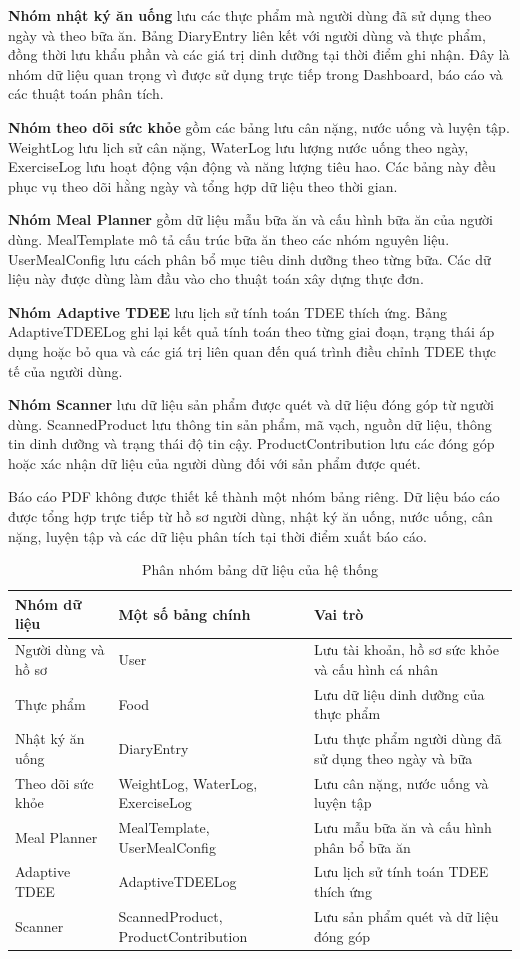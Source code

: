 \documentclass[12pt, a4paper]{report}
\begin{document}
\textbf{Nhóm nhật ký ăn uống} lưu các thực phẩm mà người dùng đã sử dụng theo ngày và theo bữa ăn. Bảng DiaryEntry liên kết với người dùng và thực phẩm, đồng thời lưu khẩu phần và các giá trị dinh dưỡng tại thời điểm ghi nhận. Đây là nhóm dữ liệu quan trọng vì được sử dụng trực tiếp trong Dashboard, báo cáo và các thuật toán phân tích.

\textbf{Nhóm theo dõi sức khỏe} gồm các bảng lưu cân nặng, nước uống và luyện tập. WeightLog lưu lịch sử cân nặng, WaterLog lưu lượng nước uống theo ngày, ExerciseLog lưu hoạt động vận động và năng lượng tiêu hao. Các bảng này đều phục vụ theo dõi hằng ngày và tổng hợp dữ liệu theo thời gian.

\textbf{Nhóm Meal Planner} gồm dữ liệu mẫu bữa ăn và cấu hình bữa ăn của người dùng. MealTemplate mô tả cấu trúc bữa ăn theo các nhóm nguyên liệu. UserMealConfig lưu cách phân bổ mục tiêu dinh dưỡng theo từng bữa. Các dữ liệu này được dùng làm đầu vào cho thuật toán xây dựng thực đơn.

\textbf{Nhóm Adaptive TDEE} lưu lịch sử tính toán TDEE thích ứng. Bảng AdaptiveTDEELog ghi lại kết quả tính toán theo từng giai đoạn, trạng thái áp dụng hoặc bỏ qua và các giá trị liên quan đến quá trình điều chỉnh TDEE thực tế của người dùng.

\textbf{Nhóm Scanner} lưu dữ liệu sản phẩm được quét và dữ liệu đóng góp từ người dùng. ScannedProduct lưu thông tin sản phẩm, mã vạch, nguồn dữ liệu, thông tin dinh dưỡng và trạng thái độ tin cậy. ProductContribution lưu các đóng góp hoặc xác nhận dữ liệu của người dùng đối với sản phẩm được quét.

Báo cáo PDF không được thiết kế thành một nhóm bảng riêng. Dữ liệu báo cáo được tổng hợp trực tiếp từ hồ sơ người dùng, nhật ký ăn uống, nước uống, cân nặng, luyện tập và các dữ liệu phân tích tại thời điểm xuất báo cáo.

\begin{table}[htbp]
\centering
\caption{Phân nhóm bảng dữ liệu của hệ thống}
\begin{tabular}{|p{4cm}|p{4cm}|p{7cm}|}
\hline
\textbf{Nhóm dữ liệu} & \textbf{Một số bảng chính} & \textbf{Vai trò} \\
\hline
Người dùng và hồ sơ & User & Lưu tài khoản, hồ sơ sức khỏe và cấu hình cá nhân \\
\hline
Thực phẩm & Food & Lưu dữ liệu dinh dưỡng của thực phẩm \\
\hline
Nhật ký ăn uống & DiaryEntry & Lưu thực phẩm người dùng đã sử dụng theo ngày và bữa \\
\hline
Theo dõi sức khỏe & WeightLog, WaterLog, ExerciseLog & Lưu cân nặng, nước uống và luyện tập \\
\hline
Meal Planner & MealTemplate, UserMealConfig & Lưu mẫu bữa ăn và cấu hình phân bổ bữa ăn \\
\hline
Adaptive TDEE & AdaptiveTDEELog & Lưu lịch sử tính toán TDEE thích ứng \\
\hline
Scanner & ScannedProduct, ProductContribution & Lưu sản phẩm quét và dữ liệu đóng góp \\
\hline
\end{tabular}
\end{table}
\end{document}
